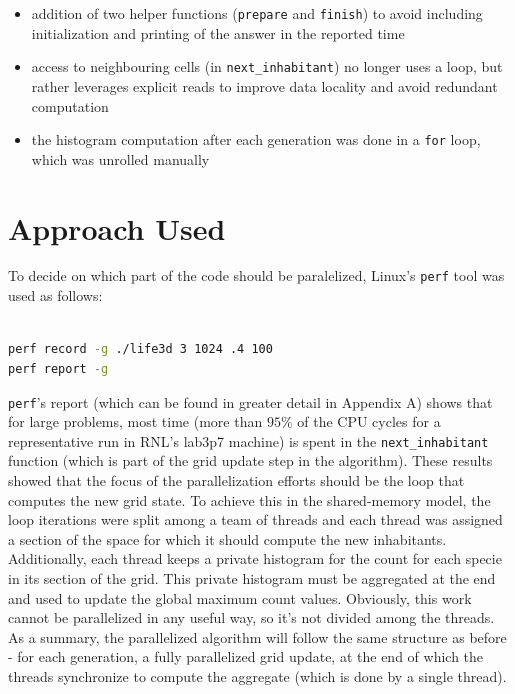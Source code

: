 \documentclass{article}
\begin{document}
\begin{itemize}
	\itemsep -0.2em
	\item addition of two helper functions (\texttt{prepare} and \texttt{finish})
		to avoid including initialization and printing of the answer in the reported time

	\item access to neighbouring cells (in \texttt{next\_inhabitant}) no longer uses a
		loop, but rather leverages explicit reads to improve data locality and avoid redundant
		computation

	\item the histogram computation after each generation was done in a
		\texttt{for} loop, which was unrolled manually
\end{itemize}

\section{Approach Used}

To decide on which part of the code should be paralelized, Linux's \texttt{perf}
tool was used as follows:

\begin{lstlisting}[language=bash,caption={Example usage of \texttt{perf} to identify
serial performance bottleneck}]

perf record -g ./life3d 3 1024 .4 100
perf report -g

\end{lstlisting}

\texttt{perf}'s report (which can be found in greater detail in Appendix A) shows
that for large problems, most time (more than $95\%$ of the CPU cycles for a
representative run in RNL's lab3p7 machine) is spent in the \texttt{next\_inhabitant}
function (which is part of the grid update step in the algorithm). These results
showed that the focus of the parallelization efforts should be the loop that
computes the new grid state. To achieve this in the
shared-memory model, the loop iterations were split among a team of
threads and each thread was assigned a section of the space for which it should compute the
new inhabitants. Additionally, each thread keeps a private histogram for the count for each
specie in its section of the grid. This private histogram must be aggregated
at the end and used to update the global maximum count values. Obviously, this
work cannot be parallelized in any useful way, so it's not divided among the threads.
As a summary, the parallelized algorithm will follow the same structure as before
- for each generation, a fully parallelized grid update, at the end of which
the threads synchronize to compute the aggregate (which is done by a single thread).
\end{document}
